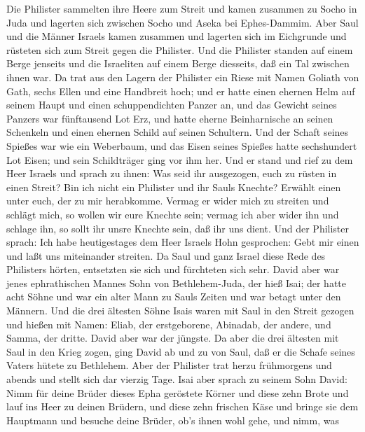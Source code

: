  Die Philister sammelten ihre Heere zum Streit und kamen
zusammen zu Socho in Juda und lagerten sich zwischen Socho und Aseka bei
Ephes-Dammim.  Aber Saul und die Männer Israels kamen
zusammen und lagerten sich im Eichgrunde und rüsteten sich zum Streit
gegen die Philister.  Und die Philister standen auf einem
Berge jenseits und die Israeliten auf einem Berge diesseits, daß ein Tal
zwischen ihnen war.  Da trat aus den Lagern der Philister
ein Riese mit Namen Goliath von Gath, sechs Ellen und eine Handbreit
hoch;  und er hatte einen ehernen Helm auf seinem Haupt und
einen schuppendichten Panzer an, und das Gewicht seines Panzers war
fünftausend Lot Erz,  und hatte eherne Beinharnische an
seinen Schenkeln und einen ehernen Schild auf seinen Schultern.
 Und der Schaft seines Spießes war wie ein Weberbaum, und
das Eisen seines Spießes hatte sechshundert Lot Eisen; und sein
Schildträger ging vor ihm her.  Und er stand und rief zu dem
Heer Israels und sprach zu ihnen: Was seid ihr ausgezogen, euch zu
rüsten in einen Streit? Bin ich nicht ein Philister und ihr Sauls
Knechte? Erwählt einen unter euch, der zu mir herabkomme. 
Vermag er wider mich zu streiten und schlägt mich, so wollen wir eure
Knechte sein; vermag ich aber wider ihn und schlage ihn, so sollt ihr
unsre Knechte sein, daß ihr uns dient.  Und der Philister
sprach: Ich habe heutigestages dem Heer Israels Hohn gesprochen: Gebt
mir einen und laßt uns miteinander streiten.  Da Saul und
ganz Israel diese Rede des Philisters hörten, entsetzten sie sich und
fürchteten sich sehr.  David aber war jenes ephrathischen
Mannes Sohn von Bethlehem-Juda, der hieß Isai; der hatte acht Söhne und
war ein alter Mann zu Sauls Zeiten und war betagt unter den Männern.
 Und die drei ältesten Söhne Isais waren mit Saul in den
Streit gezogen und hießen mit Namen: Eliab, der erstgeborene, Abinadab,
der andere, und Samma, der dritte.  David aber war der
jüngste. Da aber die drei ältesten mit Saul in den Krieg zogen,
 ging David ab und zu von Saul, daß er die Schafe seines
Vaters hütete zu Bethlehem.  Aber der Philister trat herzu
frühmorgens und abends und stellt sich dar vierzig Tage. 
Isai aber sprach zu seinem Sohn David: Nimm für deine Brüder dieses Epha
geröstete Körner und diese zehn Brote und lauf ins Heer zu deinen
Brüdern,  und diese zehn frischen Käse und bringe sie dem
Hauptmann und besuche deine Brüder, ob's ihnen wohl gehe, und nimm, was

